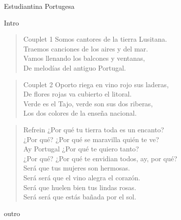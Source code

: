 \begin{song}{Estudiantina Portugesa}

\begin{instrumental}{Intro}
 \measure{} \measure{} \measure{} \measure{} \measure{} \measure{} \measure{}
\measure{} \measure{} \measure{} \measure{}  \measure{}  \measure{} \measure{} \measure{} \measure{} \measure{} \measure{} \measure{} \measure{} \measure{} \measure{} \measure{} \measure{}
\measure{} \measure{}  
\end{instrumental}

\begin{verse}{Couplet 1}
Somos cantores de la tierra Lusitana.\\
Traemos canciones de los aires y del mar.\\ 
Vamos llenando los balcones y ventanas,\\ 
De melodías del antiguo Portugal.\\ 
\end{verse}

\begin{verse}{Couplet 2}
Oporto riega en vino rojo sus laderas,\\ 
De flores rojas va cubierto el litoral.\\ 
Verde es el Tajo, verde son sus dos riberas,\\ 
Los dos colores de la enseña nacional. \\
\end{verse} 

\begin{verse}{Refrein} 
¿Por qué tu tierra toda es un encanto?\\ 
¿Por qué? ¿Por qué se maravilla quién te ve?\\ 
\chord{}Ay Portugal ¿Por qué te quiero tanto?\\
¿Por qué? ¿Por qué te envidian todos, ay, por qué? \\

Será que tus mujeres son hermosas. \\
Será será que el vino alegra el corazón.\\ 
\chord{}Será que huelen bien tus lindas rosas. \\
Será será que estás bañada por el sol. \\
\end{verse}


\begin{instrumental}{outro}
\measure{}  \measure{}  \measure{}  \measure{}  
\end{instrumental}
\end{song}

